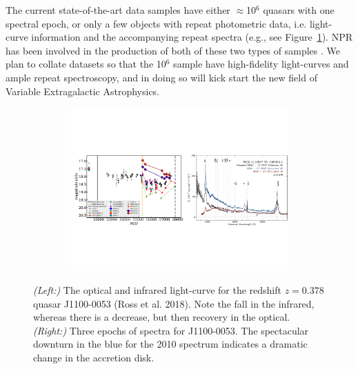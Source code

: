 \documentclass[oneside, a4paper, onecolumn, 11pt]{article}
\begin{document}
\smallskip
\noindent
The current state-of-the-art data samples have either $\approx$10$^{6}$ quasars with one spectral epoch, or only a few objects with repeat photometric data, i.e. light-curve information and the accompanying repeat spectra (e.g., see Figure~\ref{fig:J110057}).  NPR has been involved in the production of both of these two types of samples \citep{MacLeod2016, Paris2017, Ross2018}. We plan to collate datasets so that the 10$^{6}$ sample have high-fidelity light-curves and ample repeat spectroscopy, 
and in doing so will kick start the new field of Variable Extragalactic Astrophysics. 


\begin{figure}[h]
  \begin{center}
    \hspace{-0.5cm}
    \includegraphics[height=6.25cm,width=17.2cm]
    {figures/J110057_LC_Spectra_20171024.pdf}
    \vspace{-10pt}
    \caption{%
      \footnotesize 
      {\it (Left:)} The optical and infrared light-curve for the redshift $z=0.378$ quasar 
      J1100-0053 (Ross et al. 2018). 
      Note the fall in the infrared, whereas there is a decrease, but 
      then recovery in the optical. 
      {\it (Right:)} 
      Three epochs of spectra for J1100-0053. 
      The spectacular downturn in the blue for the 2010 spectrum 
      indicates a dramatic change in the accretion disk.
    }
  \vspace{-16pt}
 \label{fig:J110057}
\end{center}
\end{figure}
\end{document}
